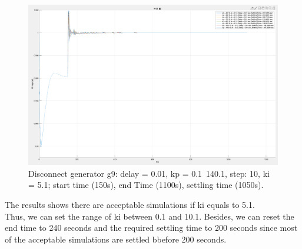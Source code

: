\begin{figure}[htbp]
\centering
\includegraphics[width = .819\textwidth]{figure/4_1_2_c.png}
\caption{Disconnect generator g9: delay = 0.01, kp = 0.1~140.1, step: 10, ki = 5.1; start time (150s), end Time (1100s), settling time (1050s).}
\label{4_1_2_c}
\end{figure}

The results shows there are acceptable simulations if ki equals to 5.1. \\

Thus, we can set the range of ki between 0.1 and 10.1. 
Besides, we can reset the end time to 240 seconds and the required settling time to 200 seconds since most of the acceptable simulations are settled bbefore 200 seconds.\\